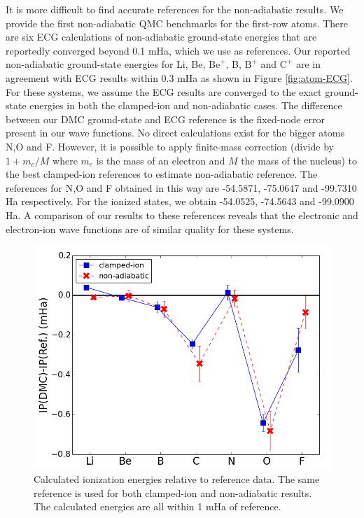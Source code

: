 \documentclass[pra,superscriptaddress,groupedaddress,twocolumn]{revtex4}
\begin{document}
It is more difficult to find accurate references for the non-adiabatic results. We provide the first non-adiabatic QMC benchmarks for the first-row atoms. There are six ECG calculations of non-adiabatic ground-state energies that are reportedly converged beyond 0.1 mHa, which we use as references. Our reported non-adiabatic ground-state energies for Li, Be, $\text{Be}^+$, B, $\text{B}^+$ and $\text{C}^+$ are in agreement with ECG results within 0.3 mHa as shown in Figure \ref{fig:atom-ECG}. For these systems, we assume the ECG results are converged to the exact ground-state energies in both the clamped-ion and non-adiabatic cases. The difference between our DMC ground-state and ECG reference is the fixed-node error present in our wave functions. No direct calculations exist for the bigger atoms N,O and F. However, it is possible to apply finite-mass correction (divide by $1+m_e/M$ where $m_e$ is the mass of an electron and $M$ the mass of the nucleus) to the best clamped-ion references to estimate non-adiabatic reference. The references for N,O and F obtained in this way are -54.5871, -75.0647 and -99.7310 Ha respectively. For the ionized states, we obtain -54.0525, -74.5643 and -99.0900 Ha. A comparison of our results to these references reveals that the electronic and electron-ion wave functions are of similar quality for these systems. %

\begin{figure}[h]
\centering
\includegraphics[scale=.37]{Figures/ionization}
\caption{Calculated ionization energies relative to reference data. The same reference is used for both clamped-ion and non-adiabatic results. The calculated energies are all within 1 mHa of reference. \label{fig:ionization}}
\end{figure}
\end{document}
